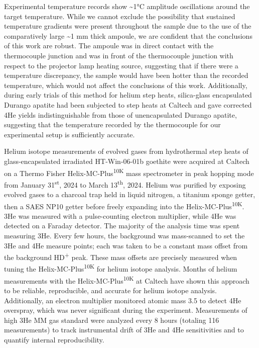 Experimental temperature records show \textasciitilde1°C amplitude
oscillations around the target temperature. While we cannot exclude the
possibility that sustained temperature gradients were present throughout
the sample due to the use of the comparatively large \textasciitilde1 mm
thick ampoule, we are confident that the conclusions of this work are
robust. The ampoule was in direct contact with the thermocouple junction
and was in front of the thermocouple junction with respect to the projector
lamp heating source, suggesting that if there were a temperature
discrepancy, the sample would have been hotter than the recorded
temperature, which would not affect the conclusions of this work.
Additionally, during early trials of this method for helium step heats,
silica-glass encapsulated Durango apatite had been subjected to step
heats at Caltech and gave corrected 4He yields indistinguishable from those of
unencapsulated Durango apatite, suggesting that the temperature recorded
by the thermocouple for our experimental setup is sufficiently accurate.

Helium isotope measurements of evolved gases from hydrothermal step
heats of glass-encapsulated irradiated HT-Win-06-01b goethite were
acquired at Caltech on a Thermo Fisher
Helix-MC-Plus\textsuperscript{10K} mass spectrometer in peak hopping
mode from January 31\textsuperscript{st}, 2024 to March
13\textsuperscript{th}, 2024. Helium was purified by exposing evolved
gases to a charcoal trap held in liquid nitrogen, a titanium sponge
getter, then a SAES NP10 getter before freely expanding into the
Helix-MC-Plus\textsuperscript{10K}. 3He was measured with a
pulse-counting electron multiplier, while 4He was detected on a Faraday
detector. The majority of the analysis time was spent measuring 3He.
Every few hours, the background was mass-scanned to set the 3He and 4He
measure points; each was taken to be a constant mass offset from the
background HD\textsuperscript{+} peak. These mass offsets are precisely
measured when tuning the Helix-MC-Plus\textsuperscript{10K} for helium
isotope analysis. Months of helium measurements with the
Helix-MC-Plus\textsuperscript{10K} at Caltech have shown this approach to
be reliable, reproducible, and accurate for helium isotope analysis.
Additionally, an electron multiplier monitored atomic mass 3.5 to detect
4He overspray, which was never significant during the experiment.
Measurements of high 3He MM gas standard were analyzed every 8 hours
(totaling 116 measurements) to track instrumental drift of 3He and 4He
sensitivities and to quantify internal reproducibility.

